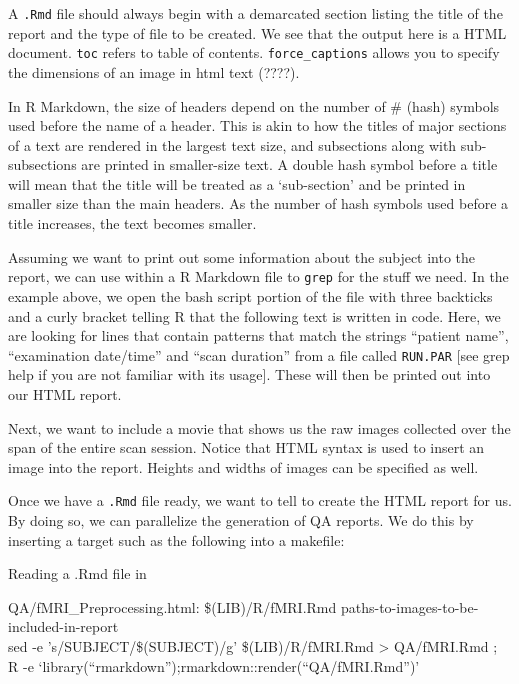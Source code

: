 A \texttt{.Rmd} file should always begin with a demarcated section listing the title of the report and the type of file to be created. We see that the output here is a HTML document. \texttt{toc} refers to table of contents. \texttt{force_captions} allows you to specify the dimensions of an image in html text (????). %

In R Markdown, the size of headers depend on the number of \# (hash) symbols used before the name of a header. This is akin to how the titles of major sections of a text are rendered in the largest text size, and subsections along with sub-subsections are printed in smaller-size text. A double hash symbol before a title will mean that the title will be treated as a `sub-section' and be printed in smaller size than the main headers. As the number of hash symbols used before a title increases, the text becomes smaller.


Assuming we want to print out some information about the subject into the report, we can use \bashn{} within a R Markdown file to \texttt{grep} for the stuff we need. In the example above, we open the bash script portion of the file with three backticks and a curly bracket telling R that the following text is written in \bashn{} code. Here, we are looking for lines that contain patterns that match the strings ``patient name'', ``examination date/time'' and ``scan duration'' from a file called \texttt{RUN.PAR} [see grep help if you are not familiar with its usage]. These will then be printed out into our HTML report.

Next, we want to include a movie that shows us the raw images collected over the span of the entire scan session. Notice that HTML syntax is used to insert an image into the report. Heights and widths of images can be specified as well. 

Once we have a \texttt{.Rmd} file ready, we want to tell \maken{} to create the HTML report for us. By doing so, we can parallelize the generation of QA reports. We do this by inserting a target such as the following into a makefile:

\begin{make}{Reading a .Rmd file in \maken{}}{}
	
	QA/fMRI_Preprocessing.html: \$(LIB)/R/fMRI.Rmd paths-to-images-to-be-included-in-report \\
	\tab sed -e 's/SUBJECT/\$(SUBJECT)/g' \$(LIB)/R/fMRI.Rmd > QA/fMRI.Rmd ;\ \\
	\tab R -e `library(``rmarkdown'');rmarkdown::render(``QA/fMRI.Rmd'')' \\
\end{make}

